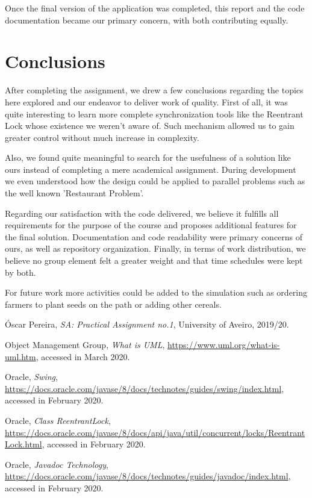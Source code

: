 \documentclass[12pt]{article}
\begin{document}
Once the final version of the application was completed, this report and the code documentation became our primary concern, with both contributing equally.

\newpage
\section*{Conclusions} %

After completing the assignment, we drew a few conclusions regarding the topics here explored and our endeavor to deliver work of quality.
First of all, it was quite interesting to learn more complete synchronization tools like the Reentrant Lock whose existence we weren't aware of.
Such mechanism allowed us to gain greater control without much increase in complexity.

Also, we found quite meaningful to search for the usefulness of a solution like ours instead of completing a mere academical assignment.
During development we even understood how the design could be applied to parallel problems such as the well known 'Restaurant Problem'.

Regarding our satisfaction with the code delivered, we believe it fulfills all requirements for the purpose of the course and proposes additional features for 
the final solution.
Documentation and code readability were primary concerns of ours, as well as repository organization.
Finally, in terms of work distribution, we believe no group element felt a greater weight and that time schedules were kept by both.

For future work more activities could be added to the simulation such as ordering farmers to plant seeds on the path or adding other cereals.

\begin{thebibliography}{9} %
  

    Óscar Pereira,
    \textit{SA: Practical Assignment no.1},
    University of Aveiro,
    2019/20.

    Object Management Group,
    \textit{What is UML},
    \url{https://www.uml.org/what-is-uml.htm},
    accessed in March 2020.

    Oracle,
    \textit{Swing},
    \url{https://docs.oracle.com/javase/8/docs/technotes/guides/swing/index.html},
    accessed in February 2020.

    Oracle,
    \textit{Class ReentrantLock},
    \url{https://docs.oracle.com/javase/8/docs/api/java/util/concurrent/locks/ReentrantLock.html},
    accessed in February 2020.
    
    Oracle,
    \textit{Javadoc Technology},
    \url{https://docs.oracle.com/javase/8/docs/technotes/guides/javadoc/index.html},
    accessed in February 2020.

\end{thebibliography}

\clearpage
\end{document}
